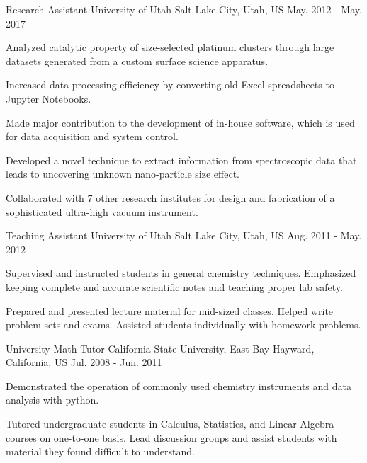 \begin{cventries}

\cventry
{Research Assistant}
{University of Utah}
{Salt Lake City, Utah, US}
{May. 2012 - May. 2017}
{
\begin{cvitems}
\item {Analyzed catalytic property of size-selected platinum clusters through  
    large datasets generated from a custom surface science apparatus.}
\item {Increased data processing efficiency by converting old Excel spreadsheets
    to Jupyter Notebooks.}
\item {Made major contribution to the development of in-house software, which is used
    for data acquisition and system control.}
\item {Developed a novel technique to extract information from spectroscopic
    data that leads to uncovering unknown nano-particle size effect.}
\item {Collaborated with 7 other research institutes for design and fabrication
    of a sophisticated ultra-high vacuum instrument.}
\end{cvitems}
}


\cventry
{Teaching Assistant}
{University of Utah}
{Salt Lake City, Utah, US}
{Aug. 2011 - May. 2012}
{
\begin{cvitems}
\item {Supervised and instructed students in general chemistry techniques.
    Emphasized keeping complete and accurate scientific notes and teaching
    proper lab safety.}
\item {Prepared and presented lecture material for mid-sized classes. Helped
    write problem sets and exams. Assisted students individually with homework
    problems.}
\end{cvitems}
}

\cventry
{University Math Tutor}
{California State University, East Bay}
{Hayward, California, US}
{Jul. 2008 - Jun. 2011}
{
\begin{cvitems}
\item {Demonstrated the operation of commonly used chemistry instruments and
    data analysis with python.}
\item {Tutored undergraduate students in Calculus, Statistics, and Linear
    Algebra courses on one-to-one basis. Lead discussion groups and assist
    students with material they found difficult to understand.}
\end{cvitems}
}

\end{cventries}